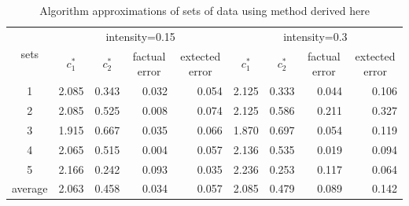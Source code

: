 \begin{table}[h!]
\centering
\caption{Algorithm approximations of sets of data using method derived here}
\label{my-label}
\begin{tabular}{|c|r|r|r|r|r|r|r|r|}
\multirow{2}{*}{sets} & \multicolumn{4}{c|}{intensity=0.15}                                                                                                            & \multicolumn{4}{c|}{intensity=0.3}                                                                                                             \\
                      & \multicolumn{1}{c|}{$c_{1}^{*}$} & \multicolumn{1}{c|}{$c_{2}^{*}$} & \multicolumn{1}{c|}{factual error} & \multicolumn{1}{c|}{extected error} & \multicolumn{1}{c|}{$c_{1}^{*}$} & \multicolumn{1}{c|}{$c_{2}^{*}$} & \multicolumn{1}{c|}{factual error} & \multicolumn{1}{c|}{extected error} \\
1                     & 2.085                            & 0.343                            & 0.032                              & 0.054                               & 2.125                            & 0.333                            & 0.044                              & 0.106                               \\
2                     & 2.085                            & 0.525                            & 0.008                              & 0.074                               & 2.125                            & 0.586                            & 0.211                              & 0.327                               \\
3                     & 1.915                            & 0.667                            & 0.035                              & 0.066                               & 1.870                            & 0.697                            & 0.054                              & 0.119                               \\
4                     & 2.065                            & 0.515                            & 0.004                              & 0.057                               & 2.136                            & 0.535                            & 0.019                              & 0.094                               \\
5                     & 2.166                            & 0.242                            & 0.093                              & 0.035                               & 2.236                            & 0.253                            & 0.117                              & 0.064                               \\
average               & 2.063                            & 0.458                            & 0.034                              & 0.057                               & 2.085                            & 0.479                            & 0.089                              & 0.142                              
\end{tabular}
\end{table}
